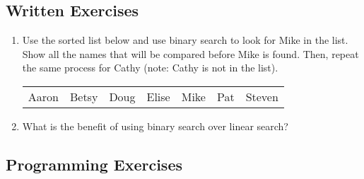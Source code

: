 \subsection{Written Exercises}

\setcounter{counter}{1}
\begin{enumerate}[label={\arabic{counter}\addtocounter{counter}{1}}.]

\item Use the sorted list below and use binary search to look for Mike in the list. Show all the names that will be compared before Mike is found. Then, repeat the same process for Cathy (note: Cathy is not in the list).
\begin{table}[h]
\begin{tabular}{lllllll}
Aaron & Betsy & Doug & Elise & Mike & Pat & Steven
\end{tabular}
\end{table}

\item What is the benefit of using binary search over linear search?


\end{enumerate}

\subsection{Programming Exercises}